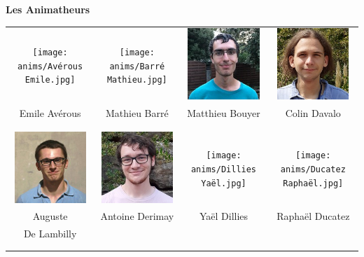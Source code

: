 \begin{center}
{\Huge\textbf{Les Animatheurs}}
\end{center}

\vfill
\vspace{2mm}
\begin{center}
\begin{tabular}{cccc}
\texttt{[image: anims/Avérous Emile.jpg]} &
\texttt{[image: anims/Barré Mathieu.jpg]} &
\includegraphics[angle=0,origin=c, width=27mm]{anims/Bouyer Matthieu.jpg} &
\includegraphics[angle=0,origin=c, width=27mm]{anims/Davalo Colin.jpg} \\
Emile Avérous & Mathieu Barré & Matthieu Bouyer & Colin Davalo \\ \\ \\ 

\includegraphics[angle=0,origin=c, width=27mm]{anims/De Lambilly Auguste.JPG} &
\includegraphics[angle=0,origin=c, width=27mm]{anims/Derimay Antoine.jpg} &
\texttt{[image: anims/Dillies Yaël.jpg]} &
\texttt{[image: anims/Ducatez Raphaël.jpg]} \\
Auguste & Antoine Derimay & Yaël Dillies & Raphaël Ducatez \\ De Lambilly & & & \\ \\ \\ 


\end{tabular}
\end{center}
